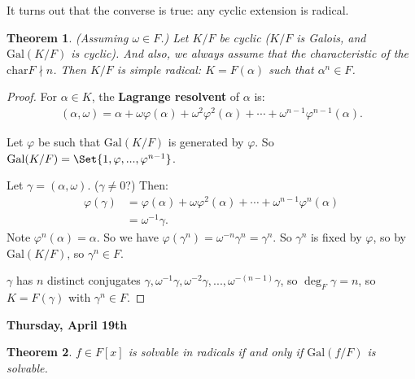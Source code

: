 \documentclass[9pt,reqno,twoside]{amsbook}
\theoremstyle{plain}
\newtheorem{theorem}{Theorem}[chapter]
\numberwithin{section}{chapter}
\numberwithin{equation}{chapter}
\theoremstyle{definition}
\theoremstyle{remark}
\theoremstyle{plain}
\newcommand{\bb}{\vspace{3mm}}
\newcommand{\bee}{\begin{equation}\begin{aligned}}
\newcommand{\eee}{\end{aligned}\end{equation}}
\newcommand{\gal}{\mathrm{Gal}}
\renewcommand{\phi}{\varphi}
\begin{document}
It turns out that the converse is true: any cyclic extension is radical. 

\begin{theorem}
(Assuming $\omega \in F$.) Let $K/F$ be cyclic ($K/F$ is Galois, and $\gal(K/F)$ is cyclic). And also, we always assume that the characteristic of the $\mathrm{char} F \nmid n$. Then $K/F$ is simple radical: $K = F(\alpha)$ such that $\alpha^n \in F$. 
\end{theorem}

\begin{proof}
For $\alpha \in K$, the \textbf{Lagrange resolvent} of $\alpha$ is:
\bee
(\alpha,\omega) = \alpha + \omega\phi(\alpha) + \omega^2 \phi^2(\alpha)  + \cdots + \omega^{n - 1}\phi^{n - 1}(\alpha).
\eee

Let $\phi$ be such that $\gal(K/F)$ is generated by $\phi$. So $\gal(K/F) = \Set{1,\phi,...,\phi^{n - 1}}$. 


Let $\gamma = (\alpha,\omega)$. ($\gamma \neq 0$?) Then:
\bee
\phi(\gamma) &= \phi(\alpha) + \omega\phi^2(\alpha) + \cdots + \omega^{n - 1}\phi^n(\alpha)\\
&= \omega^{-1}\gamma.
\eee
Note $\phi^n(\alpha) = \alpha$. So we have $\phi(\gamma^n) = \omega^{-n}\gamma^n = \gamma^n$. So $\gamma^n$ is fixed by $\phi$, so by $\gal(K/F)$, so $\gamma^n \in F$. 

$\gamma$ has $n$ distinct conjugates $\gamma,\omega^{-1}\gamma, \omega^{-2}\gamma,...,\omega^{-(n - 1)}\gamma$, so $\deg_F\gamma = n$, so $K = F(\gamma)$ with $\gamma^n \in F$. 
\end{proof}





\bb\bb

\textbf{Thursday, April 19th}

\begin{theorem}
$f \in F[x]$ is solvable in radicals if and only if $\gal(f/F)$ is solvable. 
\end{theorem}
\end{document}
